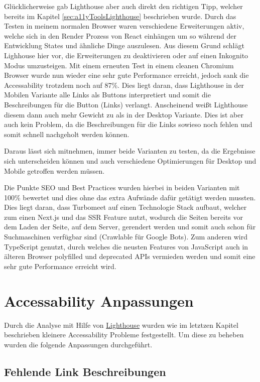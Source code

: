 Glücklicherweise gab Lighthouse aber auch direkt den richtigen Tipp, welcher bereits im Kapitel \ref{sec:a11yToolsLighthouse} beschrieben wurde. Durch das Testen in meinem normalen Browser waren verschiedene Erweiterungen aktiv, welche sich in den Render Prozess von React einhängen um so während der Entwicklung States und ähnliche Dinge auszulesen. Aus diesem Grund schlägt Lighhouse hier vor, die Erweiterungen zu deaktivieren oder auf einen Inkognito Modus umzusteigen. Mit einem erneuten Test in einem cleanen Chromium Browser wurde nun wieder eine sehr gute Performance erreicht, jedoch sank die Accessability trotzdem noch auf 87\%. Dies liegt daran, dass Lighthouse in der Mobilen Variante alle Links als Buttons interpretiert und somit die Beschreibungen für die Button (Links) verlangt. Anscheinend weißt Lighthouse diesem dann auch mehr Gewicht zu als in der Desktop Variante. Dies ist aber auch kein Problem, da die Beschreibungen für die Links sowieso noch fehlen und somit schnell nachgeholt werden können.

Daraus lässt sich mitnehmen, immer beide Varianten zu testen, da die Ergebnisse sich unterscheiden können und auch verschiedene Optimierungen für Desktop und Mobile getroffen werden müssen. 

Die Punkte SEO und Best Practices wurden hierbei in beiden Varianten mit 100\% bewertet und dies ohne das extra Aufwände dafür getätigt werden mussten. Dies liegt daran, dass Turbomeet auf einen Technologie Stack aufbaut, welcher zum einen Next.js und das SSR Feature nutzt, wodurch die Seiten bereits vor dem Laden der Seite, auf dem Server, gerendert werden und somit auch schon für Suchmaschinen verfügbar sind (Crawlable für Google Bots). Zum anderen wird TypeScript genutzt, durch welches die neusten Features von JavaScript auch in älteren Browser polyfilled und deprecated APIs vermieden werden und somit eine sehr gute Performance erreicht wird.

\section{Accessability Anpassungen}

Durch die Analyse mit Hilfe von \hyperref[ssec:lighthouse]{Lighthouse} wurden wie im letztzen Kapitel beschrieben kleinere Accessability Probleme festgestellt. Um diese zu beheben wurden die folgende Anpassungen durchgeführt.

\subsection{Fehlende Link Beschreibungen}

